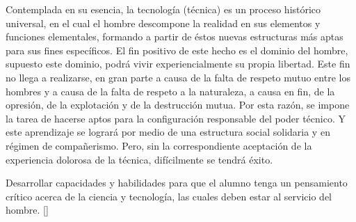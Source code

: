\begin{syllabus}


\begin{justification}
Contemplada en su esencia, la tecnología (técnica) es un proceso histórico universal, en el cual el hombre descompone la realidad en sus elementos y funciones elementales, formando a partir de éstos nuevas estructuras más aptas para sus fines específicos.
El fin positivo de este hecho es el dominio del hombre,  supuesto este dominio, podrá vivir experiencialmente su propia libertad. Este fin no llega a realizarse, en gran parte a causa de la falta de respeto mutuo entre los hombres y a causa de la falta de respeto a la naturaleza, a causa en fin, de la opresión, de la explotación y de la destrucción mutua.
Por esta razón, se impone la tarea de hacerse aptos para la configuración responsable del poder técnico. Y este aprendizaje se logrará por medio de una estructura social solidaria y en régimen de compañerismo. Pero, sin la correspondiente aceptación de la experiencia dolorosa de la técnica, difícilmente se tendrá éxito.
\end{justification}

\begin{goals}
\item Desarrollar capacidades y habilidades para que el alumno tenga un pensamiento crítico acerca de  la ciencia y tecnología, las cuales deben estar al servicio del hombre.  [\Familiarity]
\end{goals}

\begin{outcomes}
    \item {}
    \item {}
\end{outcomes}

\begin{competences}
    \item {}
    \item {}
\end{competences}


\end{syllabus}
